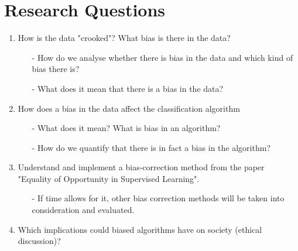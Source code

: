 \documentclass[11pt, fleqn]{article}
\begin{document}
	
	
	\section*{Research Questions}
	\begin{enumerate}
		\item How is the data "crooked"? What bias is there in the data?
		\begin{itemize}
			\item[-] How do we analyse whether there is bias in the data and which kind of bias there is? 
			\item[-] What does it mean that there is a bias in the data?
		\end{itemize}
		
		\item How does a bias in the data affect the classification algorithm
		\begin{itemize}
			\item[-] What does it mean? What is bias in an algorithm?
			\item[-] How do we quantify that there is in fact a bias in the algorithm?
		\end{itemize}
		
		\item Understand and implement a bias-correction method from the paper "Equality of Opportunity in Supervised Learning". 
			\begin{itemize}
				\item[-] If time allows for it, other bias correction methods will be taken into consideration and evaluated.
			\end{itemize}
		
		\item Which implications could biased algorithms have on society (ethical discussion)?
		
	\end{enumerate}
	
\end{document}
